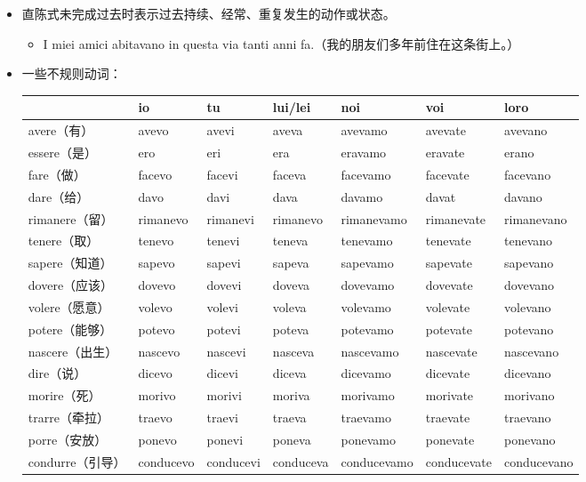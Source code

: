 \documentclass[UTF8,a4paper,titlepage,10pt]{report}
\begin{document}
\begin{enumerate}
\begin{itemize}
\item 直陈式未完成过去时表示过去持续、经常、重复发生的动作或状态。
\begin{itemize}
\item I miei amici abitavano in questa via tanti anni fa.（我的朋友们多年前住在这条街上。）
\end{itemize}
\item 一些不规则动词：
\begin{center}
\begin{tabular}{lllllll}
 & io & tu & lui/lei & noi & voi & loro\\
\hline
avere（有） & avevo & avevi & aveva & avevamo & avevate & avevano\\
essere（是） & ero & eri & era & eravamo & eravate & erano\\
fare（做） & facevo & facevi & faceva & facevamo & facevate & facevano\\
dare（给） & davo & davi & dava & davamo & davat & davano\\
rimanere（留） & rimanevo & rimanevi & rimanevo & rimanevamo & rimanevate & rimanevano\\
tenere（取） & tenevo & tenevi & teneva & tenevamo & tenevate & tenevano\\
sapere（知道） & sapevo & sapevi & sapeva & sapevamo & sapevate & sapevano\\
dovere（应该） & dovevo & dovevi & doveva & dovevamo & dovevate & dovevano\\
volere（愿意） & volevo & volevi & voleva & volevamo & volevate & volevano\\
potere（能够） & potevo & potevi & poteva & potevamo & potevate & potevano\\
nascere（出生） & nascevo & nascevi & nasceva & nascevamo & nascevate & nascevano\\
dire（说） & dicevo & dicevi & diceva & dicevamo & dicevate & dicevano\\
morire（死） & morivo & morivi & moriva & morivamo & morivate & morivano\\
trarre（牵拉） & traevo & traevi & traeva & traevamo & traevate & traevano\\
porre（安放） & ponevo & ponevi & poneva & ponevamo & ponevate & ponevano\\
condurre（引导） & conducevo & conducevi & conduceva & conducevamo & conducevate & conducevano\\
\end{tabular}
\end{center}
\end{itemize}


\end{enumerate}
\end{document}
